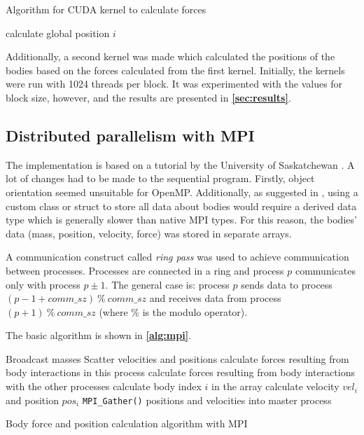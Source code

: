 \documentclass[12pt, a4paper]{article}
\begin{document}
    \begin{algorithm}
        \DontPrintSemicolon
        \caption{Algorithm for CUDA kernel to calculate forces}
        \label{alg:cuda}
        calculate global position $i$\;

    \end{algorithm}

    Additionally, a second kernel was made which calculated the positions of the bodies based on the forces calculated from the first kernel. Initially, the kernels were run with 1024 threads per block. It was experimented with the values for block size, however, and the results are presented in \textbf{\cref{sec:results}}.

    \subsection{Distributed parallelism with MPI}
    The implementation is based on a tutorial by the University of Saskatchewan \cite{nBodypdf73:online}. A lot of changes had to be made to the sequential program. Firstly, object orientation seemed unsuitable for OpenMP. Additionally, as suggested in \cite{nBodypdf73:online}, using a custom class or struct to store all data about bodies would require a derived data type which is generally slower than native MPI types. For this reason, the bodies' data (mass, position, velocity, force) was stored in separate arrays.

    A communication construct called \textit{ring pass} was used to achieve communication between processes. Processes are connected in a ring and process $p$ communicates only with process $p\pm 1$. The general case is: process $p$ sends data to process $(p-1+comm\_sz)\ \%\ comm\_sz$ and receives data from process $(p + 1)\ \%\ comm\_sz$ (where $\%$ is the modulo operator).

    The basic algorithm is shown in \textbf{\cref{alg:mpi}}.

    \begin{algorithm}[!h]
        \DontPrintSemicolon %
        Broadcast masses\;
        Scatter velocities and positions\;
         {        
        calculate forces resulting from body interactions in this process\;
        calculate forces resulting from body interactions with the other processes\;
         {
        calculate body index $i$ in the array\;
        calculate velocity $vel_i$ and position $pos_i$\;
        }
        \texttt{MPI\_Gather()} positions and velocities into master process\;
        }
        \caption{Body force and position calculation algorithm with MPI}
        \label{alg:mpi}
    \end{algorithm}
\end{document}
